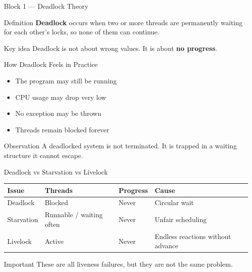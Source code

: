 \documentclass[aspectratio=169,11pt]{beamer}
\begin{document}
	\begin{frame}{Block 1 --- Deadlock Theory}
		\begin{block}{Definition}
			\textbf{Deadlock} occurs when two or more threads are permanently waiting
			for each other’s locks, so none of them can continue.
		\end{block}
		
		\bigskip
		
		\begin{alertblock}{Key idea}
			Deadlock is not about wrong values.  
			It is about \textbf{no progress}.
		\end{alertblock}
	\end{frame}
	
	\begin{frame}{How Deadlock Feels in Practice}
		\begin{itemize}
			\item The program may still be running
			\item CPU usage may drop very low
			\item No exception may be thrown
			\item Threads remain blocked forever
		\end{itemize}
		
		\bigskip
		
		\begin{block}{Observation}
			A deadlocked system is not terminated.  
			It is trapped in a waiting structure it cannot escape.
		\end{block}
	\end{frame}
	
	\begin{frame}{Deadlock vs Starvation vs Livelock}
		\centering
		\begin{tabular}{@{}llll@{}}
			\toprule
			\textbf{Issue} & \textbf{Threads} & \textbf{Progress} & \textbf{Cause} \\
			\midrule
			Deadlock & Blocked & Never & Circular wait \\
			Starvation & Runnable / waiting often & Never & Unfair scheduling \\
			Livelock & Active & Never & Endless reactions without advance \\
			\bottomrule
		\end{tabular}
		
		\bigskip
		
		\begin{alertblock}{Important}
			These are all liveness failures, but they are not the same problem.
		\end{alertblock}
	\end{frame}
	
\end{document}
